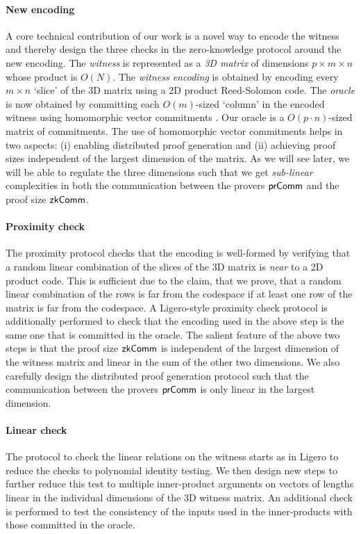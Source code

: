 \paragraph{New encoding} A core technical contribution of our work is a novel way to encode the witness and thereby design the three checks in the zero-knowledge protocol around the new encoding. The \textit{witness} is represented as a \textit{3D matrix} of dimensions $p \times m \times n$ whose product is $O(N)$. The \textit{witness encoding} is obtained by encoding every $m \times n$ `slice' of the 3D matrix using a 2D product Reed-Solomon code. The \textit{oracle} is now obtained by committing each $O(m)$-sized `column' in the encoded witness using homomorphic vector commitments \cite{Ped92}. 
Our oracle is a $O(p \cdot n)$-sized matrix of commitments. The use of homomorphic vector commitments helps in two aspects: (i) enabling distributed proof generation and (ii) achieving proof sizes independent of the largest dimension of the matrix.
As we will see later, we will be able to regulate the three dimensions such that we get \textit{sub-linear} complexities in both the communication between the provers $\mathsf{prComm}$ and the proof size $\mathsf{zkComm}$. 
\paragraph{Proximity check} The proximity protocol checks that the encoding is well-formed by verifying that a random linear combination of the slices of the 3D matrix is \textit{near} to a 2D product code. This is sufficient due to the claim, that we prove, that a random linear combination of the rows is far from the codespace if at least one row of the matrix is far from the codespace. A Ligero-style proximity check protocol is additionally performed to check that the encoding used in the above step is the same one that is committed in the oracle. The salient feature of the above two steps is that the proof size $\mathsf{zkComm}$ is independent of the largest dimension of the witness matrix and linear in the sum of the other two dimensions. We also carefully design the distributed proof generation protocol such that the communication between the provers $\mathsf{prComm}$ is only linear in the largest dimension.
\paragraph{Linear check} The protocol to check the linear relations on the witness starts as in Ligero to reduce the checks to polynomial identity testing. We then design new steps to further reduce this test to multiple inner-product arguments on vectors of lengths linear in the individual dimensions of the 3D witness matrix. An additional check is performed to test the consistency of the inputs used in the inner-products with those committed in the oracle.
